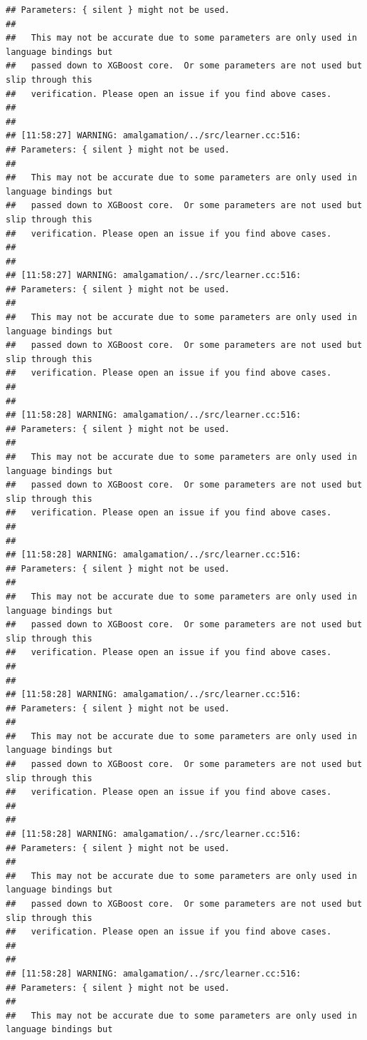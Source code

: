 \documentclass[AMS,STIX2COL]{WileyNJD-v2}\usepackage[]{graphicx}\usepackage[]{color}
\makeatletter
\newenvironment{kframe}{%
 \def\at@end@of@kframe{}%
 \ifinner\ifhmode%
  \def\at@end@of@kframe{\end{minipage}}%
  \begin{minipage}{\columnwidth}%
 \fi\fi%
 \def\FrameCommand##1{\hskip\@totalleftmargin \hskip-\fboxsep
 \colorbox{shadecolor}{##1}\hskip-\fboxsep
     \hskip-\linewidth \hskip-\@totalleftmargin \hskip\columnwidth}%
 \MakeFramed {\advance\hsize-\width
   \@totalleftmargin\z@ \linewidth\hsize
   \@setminipage}}%
 {\par\unskip\endMakeFramed%
 \at@end@of@kframe}
\newenvironment{knitrout}{}{} %
\makeatother
\begin{document}
\begin{knitrout}
\begin{kframe}
\begin{verbatim}
## Parameters: { silent } might not be used.
## 
##   This may not be accurate due to some parameters are only used in language bindings but
##   passed down to XGBoost core.  Or some parameters are not used but slip through this
##   verification. Please open an issue if you find above cases.
## 
## 
## [11:58:27] WARNING: amalgamation/../src/learner.cc:516: 
## Parameters: { silent } might not be used.
## 
##   This may not be accurate due to some parameters are only used in language bindings but
##   passed down to XGBoost core.  Or some parameters are not used but slip through this
##   verification. Please open an issue if you find above cases.
## 
## 
## [11:58:27] WARNING: amalgamation/../src/learner.cc:516: 
## Parameters: { silent } might not be used.
## 
##   This may not be accurate due to some parameters are only used in language bindings but
##   passed down to XGBoost core.  Or some parameters are not used but slip through this
##   verification. Please open an issue if you find above cases.
## 
## 
## [11:58:28] WARNING: amalgamation/../src/learner.cc:516: 
## Parameters: { silent } might not be used.
## 
##   This may not be accurate due to some parameters are only used in language bindings but
##   passed down to XGBoost core.  Or some parameters are not used but slip through this
##   verification. Please open an issue if you find above cases.
## 
## 
## [11:58:28] WARNING: amalgamation/../src/learner.cc:516: 
## Parameters: { silent } might not be used.
## 
##   This may not be accurate due to some parameters are only used in language bindings but
##   passed down to XGBoost core.  Or some parameters are not used but slip through this
##   verification. Please open an issue if you find above cases.
## 
## 
## [11:58:28] WARNING: amalgamation/../src/learner.cc:516: 
## Parameters: { silent } might not be used.
## 
##   This may not be accurate due to some parameters are only used in language bindings but
##   passed down to XGBoost core.  Or some parameters are not used but slip through this
##   verification. Please open an issue if you find above cases.
## 
## 
## [11:58:28] WARNING: amalgamation/../src/learner.cc:516: 
## Parameters: { silent } might not be used.
## 
##   This may not be accurate due to some parameters are only used in language bindings but
##   passed down to XGBoost core.  Or some parameters are not used but slip through this
##   verification. Please open an issue if you find above cases.
## 
## 
## [11:58:28] WARNING: amalgamation/../src/learner.cc:516: 
## Parameters: { silent } might not be used.
## 
##   This may not be accurate due to some parameters are only used in language bindings but

\end{verbatim}
\end{kframe}
\end{knitrout}
\end{document}

